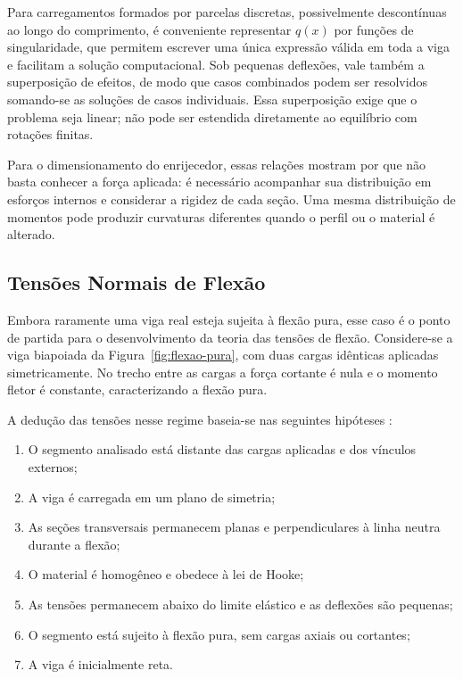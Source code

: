 \documentclass[arial,centeredequations,english,brazilian,oneside,section=TITLE]{ifes8}
\begin{document}
Para carregamentos formados por parcelas discretas, possivelmente descontínuas ao longo
do comprimento, é conveniente representar $q(x)$ por funções de singularidade, que
permitem escrever uma única expressão válida em toda a viga e facilitam a solução
computacional. Sob pequenas deflexões, vale também a
superposição de efeitos, de modo que casos combinados podem ser resolvidos somando-se
as soluções de casos individuais. Essa superposição exige que o problema
seja linear; não pode ser estendida diretamente ao equilíbrio com rotações finitas.

Para o dimensionamento do enrijecedor, essas relações mostram por que não basta
conhecer a força aplicada: é necessário acompanhar sua distribuição em esforços
internos e considerar a rigidez de cada seção. Uma mesma distribuição de momentos
pode produzir curvaturas diferentes quando o perfil ou o material é alterado.

\subsection{Tensões Normais de Flexão}
\label{sub:tensoes-flexao}

Embora raramente uma viga real esteja sujeita à flexão pura, esse caso é o ponto de
partida para o desenvolvimento da teoria das tensões de flexão. Considere-se a viga
biapoiada da Figura~\ref{fig:flexao-pura}, com duas cargas idênticas aplicadas
simetricamente. No trecho entre as cargas a força cortante é nula e o momento
fletor é constante, caracterizando a flexão pura.

A dedução das tensões nesse regime baseia-se nas seguintes hipóteses
\cite{Norton2013}:

\begin{enumerate}
  \item O segmento analisado está distante das cargas aplicadas e dos vínculos externos;
  \item A viga é carregada em um plano de simetria;
  \item As seções transversais permanecem planas e perpendiculares à linha neutra
  durante a flexão;
  \item O material é homogêneo e obedece à lei de Hooke;
  \item As tensões permanecem abaixo do limite elástico e as deflexões são pequenas;
  \item O segmento está sujeito à flexão pura, sem cargas axiais ou cortantes;
  \item A viga é inicialmente reta.
\end{enumerate}
\end{document}
